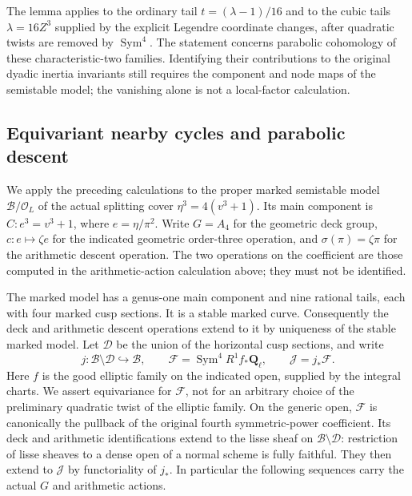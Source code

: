 \begin{remark}
The lemma applies to the ordinary tail $t=(\lambda-1)/16$ and
 to the cubic tails $\lambda=16Z^3$ supplied by the explicit
 Legendre coordinate changes, after quadratic twists are removed
 by $\operatorname{Sym}^4$.  The statement concerns parabolic
 cohomology of these characteristic-two families.  Identifying
 their contributions to the original dyadic inertia invariants
 still requires the component and node maps of the semistable
 model; the vanishing alone is not a local-factor calculation.
\end{remark}
\subsection{Equivariant nearby cycles and parabolic descent}

We apply the preceding calculations to the proper marked semistable
model $\mathcal B/\mathcal O_L$ of the actual splitting cover
$\eta^3=4(v^3+1)$. Its main component is $C:e^3=v^3+1$, where
$e=\eta/\pi^2$. Write $G=A_4$ for the geometric deck group,
$c:e\mapsto\zeta e$ for the indicated geometric order-three operation,
and $\sigma(\pi)=\zeta\pi$ for the arithmetic descent operation.
The two operations on the coefficient are those computed in the
arithmetic-action calculation above; they must not be identified.

The marked model has a genus-one main component and nine rational tails,
each with four marked cusp sections. It is a stable marked curve.
Consequently the deck and arithmetic descent operations extend to it
by uniqueness of the stable marked model. Let $\mathcal D$ be the union
of the horizontal cusp sections, and write
\[
 j:\mathcal B\setminus\mathcal D\hookrightarrow\mathcal B,
 \qquad
 \mathcal F=\operatorname{Sym}^4R^1f_*\mathbf Q_\ell,
 \qquad \mathcal J=j_*\mathcal F.
\]
Here $f$ is the good elliptic family on the indicated open, supplied by
the integral charts. We assert equivariance for $\mathcal F$, not for
an arbitrary choice of the preliminary quadratic twist of the elliptic
family. On the generic open, $\mathcal F$ is canonically the pullback
of the original fourth symmetric-power coefficient. Its deck and
arithmetic identifications extend to the lisse sheaf on
$\mathcal B\setminus\mathcal D$: restriction of lisse sheaves to a
dense open of a normal scheme is fully faithful. They then extend to
$\mathcal J$ by functoriality of $j_*$. In particular the following
sequences carry the actual $G$ and arithmetic actions.

